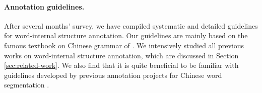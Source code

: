 


\paragraph{Annotation guidelines.} 
After several months' survey,  we have compiled  systematic and detailed
 guidelines for word-internal structure annotation. 
Our guidelines are mainly based on the famous textbook on Chinese grammar of \citet{grammar-notes-zhu-1982}. 
We intensively studied all previous works on word-internal structure annotation, which are discussed in Section \ref{sec:related-work}.
We also find that it is quite beneficial to be familiar with guidelines developed by previous annotation projects for Chinese word segmentation \cite{ctb-xiafei,yu2003ppd}.

